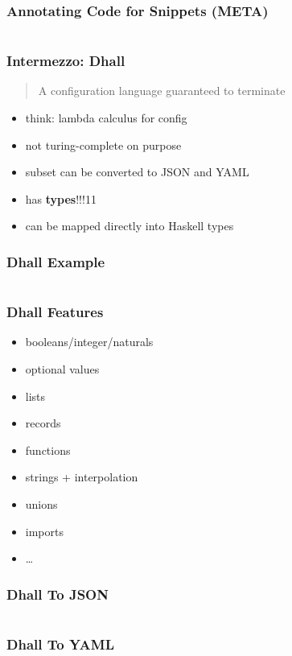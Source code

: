 \documentclass{beamer}
\begin{document}
\begin{frame}
  \frametitle{Annotating Code for Snippets (META)}
  \begin{center}
    \inputminted[autogobble]{haskell}{snippets/outer-pdf-rule.hs}
  \end{center}
\end{frame}

\begin{frame}
  \frametitle{Intermezzo: Dhall}
  \begin{quote}
    A configuration language guaranteed to terminate
  \end{quote}
  \begin{itemize}
  \item think: lambda calculus for config
  \item not turing-complete on purpose
  \item subset can be converted to JSON and YAML
  \item has \textbf{types}!!!11
  \item can be mapped directly into Haskell types
  \end{itemize}
\end{frame}

\begin{frame}
  \frametitle{Dhall Example}
  \inputminted[autogobble]{haskell}{dhall/example.dhall}
\end{frame}

\begin{frame}
  \frametitle{Dhall Features}
  \begin{itemize}
  \item booleans/integer/naturals
  \item optional values
  \item lists
  \item records
  \item functions
  \item strings + interpolation
  \item unions
  \item imports
  \item \ldots{}
  \end{itemize}
\end{frame}

\begin{frame}
  \frametitle{Dhall To JSON}
  \inputminted[autogobble]{json}{dhall/example.json}
\end{frame}

\begin{frame}
  \frametitle{Dhall To YAML}
  \inputminted[autogobble]{yaml}{dhall/example.yaml}
\end{frame}
\end{document}
